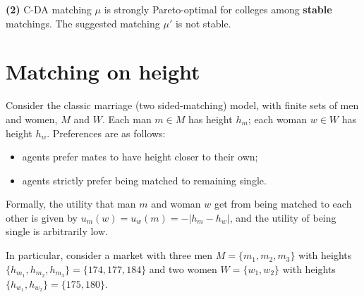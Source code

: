 \documentclass[a4paper]{article}
\begin{document}
	\textbf{(2)} %
	C-DA matching $\mu$ is strongly Pareto-optimal for colleges among \textbf{stable} matchings. The suggested matching $\mu'$ is not stable.
\fi



\section{Matching on height}
	Consider the classic marriage (two sided-matching) model, with finite sets of men and women, $M$ and $W$.  Each man $m \in M$ has height $h_m$; each woman $w \in W$ has height $h_w$.  Preferences are as follows:
	
	\begin{itemize}
		\item agents prefer mates to have height closer to their own;
		\item agents strictly prefer being matched to remaining single.
	\end{itemize}
	
	Formally, the utility that man $m$ and woman $w$ get from being matched to each other is given by $u_m(w) = u_w(m) = -|h_m - h_w|$, and the utility of being single is arbitrarily low.
	
	In particular, consider a market with three men $M = \{m_1,m_2,m_3\}$ with heights $\{h_{m_1}, h_{m_2}, h_{m_3}\} = \{174,177,184\}$ and two women $W = \{w_1,w_2\}$ with heights $\{h_{w_1}, h_{w_2}\} = \{175,180\}$.
	
\end{document}
